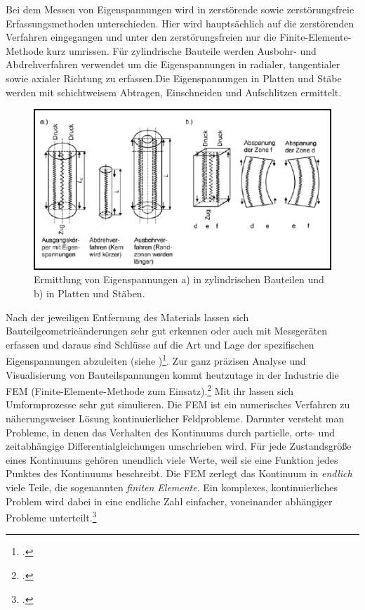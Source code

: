 \documentclass[12pt,a4paper,parskip]{scrartcl}
\begin{document}
Bei dem Messen von Eigenspannungen wird in zerstörende sowie zerstörungsfreie Erfassungsmethoden unterschieden. Hier wird hauptsächlich auf die zerstörenden Verfahren eingegangen und unter den zerstörungsfreien nur die Finite-Elemente-Methode kurz umrissen. Für zylindrische Bauteile werden Ausbohr- und Abdrehverfahren verwendet um die Eigenspannungen in radialer, tangentialer sowie axialer Richtung zu erfassen.Die Eigenspannungen in Platten und Stäbe werden mit schichtweisem Abtragen, Einschneiden und Aufschlitzen ermittelt.\begin{figure}[!htb]
  \centering
  \includegraphics[scale=1.1] {eigenspanschnitt}
  \caption{Ermittlung von Eigenspannungen a) in zylindrischen Bauteilen und b) in Platten und Stäben.}
  \label{fig:eigenspanschnitt}
  \end{figure}
  Nach der jeweiligen Entfernung des Materials lassen sich Bauteilgeometrieänderungen sehr gut erkennen oder auch mit Messgeräten erfassen und daraus  sind Schlüsse auf die Art und Lage der spezifischen Eigenspannungen abzuleiten (siehe )\footcite[36]{hu}. Zur ganz präzisen Analyse  und Visualisierung von Bauteilspannungen kommt heutzutage in der Industrie  die FEM (Finite-Elemente-Methode zum Einsatz).\footcite[Vgl.][32-37]{hu} Mit ihr lassen sich Umformprozesse sehr gut simulieren. Die FEM ist ein numerisches Verfahren zu näherungsweiser Lösung kontinuierlicher Feldprobleme. Darunter versteht man Probleme, in denen das Verhalten des Kontinuums durch partielle, orts- und zeitabhängige Differentialgleichungen umschrieben wird. Für jede Zustandsgröße eines Kontinuums gehören unendlich viele Werte, weil sie eine Funktion jedes Punktes des Kontinuums beschreibt. Die FEM zerlegt das Kontinuum in \emph{endlich} viele Teile, die sogenannten \emph{finiten Elemente}. Ein komplexes, kontinuierliches Problem wird dabei in eine endliche Zahl einfacher, voneinander abhängiger Probleme unterteilt.\footcite[Vgl.][48]{fu}
\end{document}
